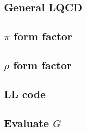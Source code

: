 \subsection{General LQCD}

\subsection{$\pi$ form factor}

\subsection{$\rho$ form factor}

\subsection{LL code}

\subsection{Evaluate $G$}


\clearpage